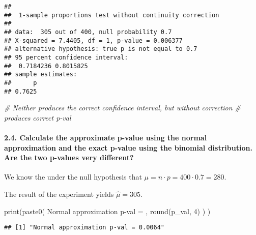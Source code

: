 \documentclass[
]{article}
\newenvironment{Shaded}{\begin{snugshade}}{\end{snugshade}}
\newcommand{\CommentTok}[1]{\textcolor[rgb]{0.56,0.35,0.01}{\textit{#1}}}
\newcommand{\DecValTok}[1]{\textcolor[rgb]{0.00,0.00,0.81}{#1}}
\newcommand{\FunctionTok}[1]{\textcolor[rgb]{0.00,0.00,0.00}{#1}}
\newcommand{\NormalTok}[1]{#1}
\newcommand{\StringTok}[1]{\textcolor[rgb]{0.31,0.60,0.02}{#1}}
\begin{document}
\begin{verbatim}
## 
##  1-sample proportions test without continuity correction
## 
## data:  305 out of 400, null probability 0.7
## X-squared = 7.4405, df = 1, p-value = 0.006377
## alternative hypothesis: true p is not equal to 0.7
## 95 percent confidence interval:
##  0.7184236 0.8015825
## sample estimates:
##      p 
## 0.7625
\end{verbatim}

\begin{Shaded}
\begin{Highlighting}[]
\CommentTok{\# Neither produces the correct confidence interval, but without correction }
\CommentTok{\# produces correct p{-}val}
\end{Highlighting}
\end{Shaded}

\hypertarget{calculate-the-approximate-p-value-using-the-normal-approximation-and-the-exact-p-value-using-the-binomial-distribution.-are-the-two-p-values-very-different}{%
\paragraph{2.4. Calculate the approximate p-value using the normal
approximation and the exact p-value using the binomial distribution. Are
the two p-values very
different?}\label{calculate-the-approximate-p-value-using-the-normal-approximation-and-the-exact-p-value-using-the-binomial-distribution.-are-the-two-p-values-very-different}}

We know the under the null hypothesis that
\(\mu=n \cdot p=400 \cdot 0.7=280\).

The result of the experiment yields \(\hat\mu=305\).

\begin{Shaded}
\begin{Highlighting}[]
\FunctionTok{print}\NormalTok{(}\FunctionTok{paste0}\NormalTok{(}
  \StringTok{\textquotesingle{}Normal approximation p{-}val = \textquotesingle{}}\NormalTok{,}
  \FunctionTok{round}\NormalTok{(p\_val, }\DecValTok{4}\NormalTok{)}
\NormalTok{  )}
\NormalTok{)}
\end{Highlighting}
\end{Shaded}

\begin{verbatim}
## [1] "Normal approximation p-val = 0.0064"
\end{verbatim}
\end{document}
